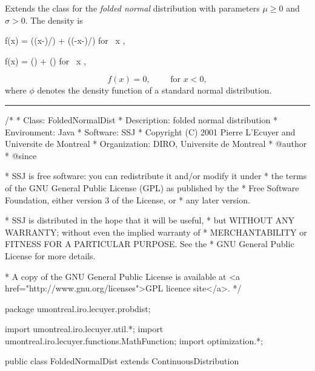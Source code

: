 
Extends the class  for
the {\em folded normal\/} distribution with
parameters $\mu \ge 0$  and $\sigma > 0$.
The density is
\begin{htmlonly}
\eq
 f(x) =   \phi \left((x-\mu)/\sigma\right) + \phi \left((-x-\mu)/\sigma\right) 
   \qquad \mbox {for  } x ,
\endeq
\end{htmlonly}
\begin{latexonly} 
\eq
 f(x) = \phi \left(\right) +
        \phi \left(\right) 
   \qquad \mbox {for  } x ,   
\endeq
\end{latexonly}
$$
f(x) = 0, \qquad \mbox{ for } x < 0,
$$ 
where $ \phi $ denotes the density function 
of a standard normal distribution.

\bigskip\hrule

\begin{code}
\begin{hide}
/*
 * Class:        FoldedNormalDist
 * Description:  folded normal distribution
 * Environment:  Java
 * Software:     SSJ 
 * Copyright (C) 2001  Pierre L'Ecuyer and Universite de Montreal
 * Organization: DIRO, Universite de Montreal
 * @author       
 * @since

 * SSJ is free software: you can redistribute it and/or modify it under
 * the terms of the GNU General Public License (GPL) as published by the
 * Free Software Foundation, either version 3 of the License, or
 * any later version.

 * SSJ is distributed in the hope that it will be useful,
 * but WITHOUT ANY WARRANTY; without even the implied warranty of
 * MERCHANTABILITY or FITNESS FOR A PARTICULAR PURPOSE.  See the
 * GNU General Public License for more details.

 * A copy of the GNU General Public License is available at
   <a href="http://www.gnu.org/licenses">GPL licence site</a>.
 */
\end{hide}
package  umontreal.iro.lecuyer.probdist;
\begin{hide}
import umontreal.iro.lecuyer.util.*;
import umontreal.iro.lecuyer.functions.MathFunction;
import optimization.*;
\end{hide}

public class FoldedNormalDist extends ContinuousDistribution\begin{hide} {
   protected double mu;
   protected double sigma;
   private static final double RACPI = 1.7724538509055160273; // Sqrt[PI]

   private static class FunctionInverse implements MathFunction {
        private double u, mu, sigma;

        public FunctionInverse (double mu, double sigma, double u) {
            this.u = u;
            this.mu = mu;
            this.sigma = sigma;
        }

        public double evaluate (double x) {
            return u - cdf(mu, sigma, x);
        }
    }

\end{hide}\end{code}

